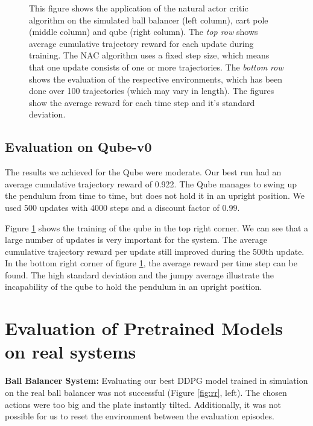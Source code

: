 \begin{figure}
\begin{center}
		\hspace{1.5mm}
		\caption{This figure shows the application of the natural actor critic algorithm on the simulated ball balancer (left column), cart pole (middle column) and qube (right column). The \textit{top row} shows average cumulative trajectory reward for each update during training. The NAC algorithm uses a fixed step size, which means that one update consists of one or more trajectories. The\textit{ bottom row} shows the evaluation of the respective environments, which has been done over 100 trajectories (which may vary in length). The figures show the average reward for each time step and it's standard deviation.}
		\label{fig:nac}
	\end{center}
\end{figure}

\subsection{Evaluation on Qube-v0}

The results we achieved for the Qube were moderate. Our best run had an average cumulative trajectory reward of 0.922. The Qube manages to swing up the pendulum from time to time, but does not hold it in an upright position. We used 500 updates with 4000 steps and a discount factor of 0.99. 

Figure \ref{fig:nac} shows the training of the qube in the top right corner. We can see that a large number of updates is very important for the system. The average cumulative trajectory reward per update still improved during the 500th update. In the bottom right corner of figure \ref{fig:nac}, the average reward per time step can be found. The high standard deviation and the jumpy average illustrate the incapability of the qube to hold the pendulum in an upright position.




\section{Evaluation of Pretrained Models on real systems}

\textbf{Ball Balancer System:} Evaluating our best DDPG model trained in simulation on the real ball balancer was not successful (Figure \ref{fig:rr}, left). The chosen actions were too big and the plate instantly tilted. Additionally, it was not possible for us to reset the environment between the evaluation episodes.

